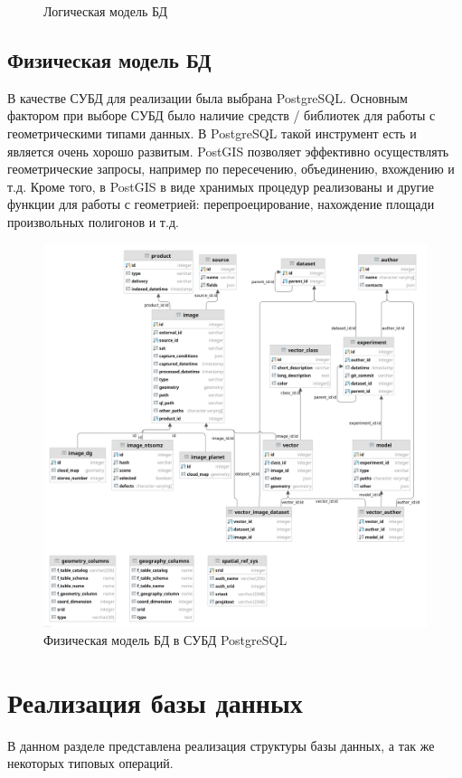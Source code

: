\documentclass[a4paper]{article}
\begin{document}
\begin{figure}[h]
	\centering
	
	\caption{Логическая модель БД}
\end{figure}


\subsection{Физическая модель БД}
В качестве СУБД для реализации была выбрана PostgreSQL.
Основным фактором при выборе СУБД было наличие средств / библиотек для работы с геометрическими типами данных.
В PostgreSQL такой инструмент есть и является очень хорошо развитым.
PostGIS позволяет эффективно осуществлять геометрические запросы, например по пересечению, объединению, вхождению и т.д.
Кроме того, в PostGIS в виде хранимых процедур реализованы и другие функции для работы с геометрией: перепроецирование, нахождение площади произвольных полигонов и т.д.

\begin{figure}[h]
	\centering
	\includegraphics[width=\columnwidth]{./images/Physics.png}
	\caption{Физическая модель БД в СУБД PostgreSQL}
\end{figure}


\section{Реализация базы данных}
В данном разделе представлена реализация структуры базы данных, а так же некоторых типовых операций.
\end{document}
